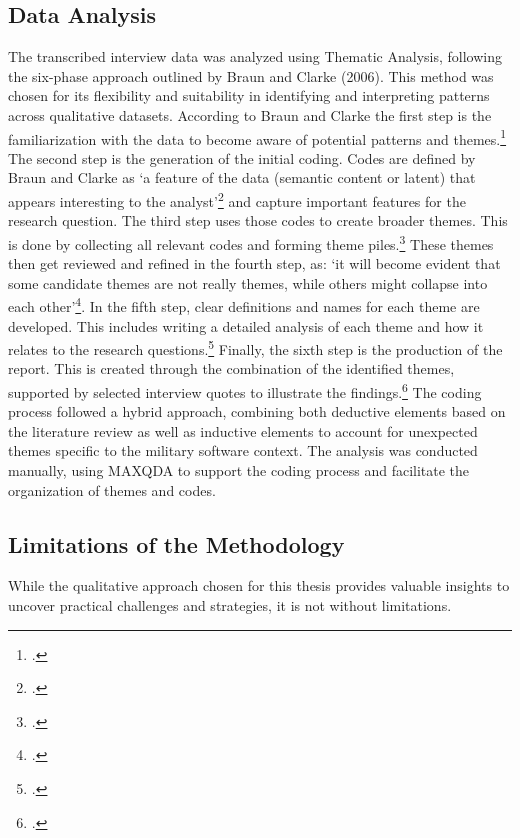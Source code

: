 \subsection{Data Analysis}
The transcribed interview data was analyzed using Thematic Analysis, following the six-phase approach outlined by Braun and Clarke (2006). This method was chosen for its flexibility and suitability in identifying and interpreting patterns across qualitative datasets.
According to Braun and Clarke the first step is the familiarization with the data to become aware of potential patterns and themes.\footcite[16]{braunUsingThematicAnalysis2006} The second step is the generation of the initial coding. Codes are defined by Braun and Clarke as
`a feature of the data  (semantic content or latent) that appears interesting to the analyst'\footcite[18]{braunUsingThematicAnalysis2006} and capture important features for the research question. The third step uses those codes to create broader themes. This is done 
by collecting all relevant codes and forming theme piles.\footcite[19-20]{braunUsingThematicAnalysis2006} These themes then get reviewed and refined in the fourth step, as: `it will become evident that some candidate themes are not really  themes, while  others might collapse into each other'\footcite[20]{braunUsingThematicAnalysis2006}.
In the fifth step, clear definitions and names for each theme are developed. This includes writing a detailed analysis of each theme and how it relates to the research questions.\footcite[22]{braunUsingThematicAnalysis2006} 
Finally, the sixth step is the production of the report. This is created through the combination of the identified themes, supported by selected interview quotes to illustrate the findings.\footcite[23]{braunUsingThematicAnalysis2006}
The coding process followed a hybrid approach, combining both deductive elements based on the literature review as well as inductive elements to account for unexpected themes specific to the military software context. The analysis was conducted manually, using MAXQDA to support the coding process and facilitate the organization of themes and codes.\\
\subsection{Limitations of the Methodology}
While the qualitative approach chosen for this thesis provides valuable insights to uncover practical challenges and strategies, it is not without limitations.\\

